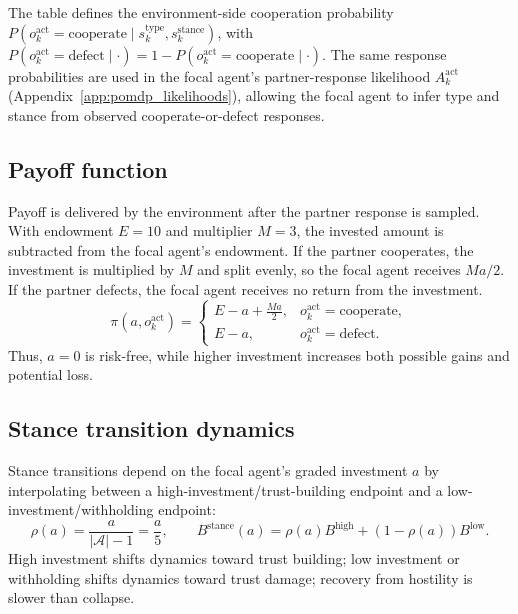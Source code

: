 The table defines the environment-side cooperation probability \(P(o^{\mathrm{act}}_k=\mathrm{cooperate}\mid s^{\mathrm{type}}_k,s^{\mathrm{stance}}_k)\), with \(P(o^{\mathrm{act}}_k=\mathrm{defect}\mid \cdot)=1-P(o^{\mathrm{act}}_k=\mathrm{cooperate}\mid \cdot)\).
The same response probabilities are used in the focal agent's partner-response likelihood \(A^{\mathrm{act}}_k\) (Appendix~\ref{app:pomdp_likelihoods}), allowing the focal agent to infer type and stance from observed cooperate-or-defect responses.

\subsection{Payoff function}
\label{app:process_payoff}

Payoff is delivered by the environment after the partner response is sampled. With endowment \(E=10\) and multiplier \(M=3\), the invested amount is subtracted from the focal agent's endowment. If the partner cooperates, the investment is multiplied by \(M\) and split evenly, so the focal agent receives \(Ma/2\). If the partner defects, the focal agent receives no return from the investment.
\begin{equation}
\pi(a,o_k^{\mathrm{act}})=
\begin{cases}
E-a+\frac{Ma}{2}, & o_k^{\mathrm{act}}=\mathrm{cooperate},\\
E-a, & o_k^{\mathrm{act}}=\mathrm{defect}.
\end{cases}
\label{eq:graded_payoff_map}
\end{equation}
Thus, \(a=0\) is risk-free, while higher investment increases both possible gains and potential loss.

\subsection{Stance transition dynamics}
\label{app:process_stance}

Stance transitions depend on the focal agent's graded investment $a$ by interpolating between a high-investment/trust-building endpoint and a low-investment/withholding endpoint:
\begin{equation}
\rho(a)=\frac{a}{|\mathcal{A}|-1}=\frac{a}{5},
\qquad
B^{\mathrm{stance}}(a)=\rho(a)B^{\mathrm{high}}+(1-\rho(a))B^{\mathrm{low}}.
\label{eq:b_stance}
\end{equation}
High investment shifts dynamics toward trust building; low investment or withholding shifts dynamics toward trust damage; recovery from hostility is slower than collapse.

